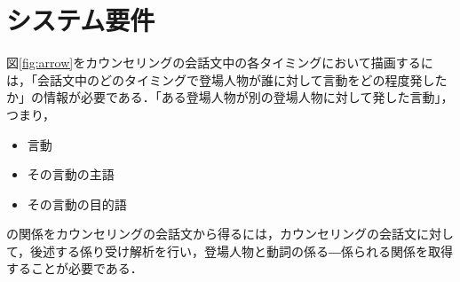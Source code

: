 \documentclass[shuuron]{kuee}
\begin{document}





%
%
%
%


\section{システム要件}%

%


図\ref{fig:arrow}をカウンセリングの会話文中の各タイミングにおいて描画するには，「会話文中のどのタイミングで登場人物が誰に対して言動をどの程度発したか」の情報が必要である．「ある登場人物が別の登場人物に対して発した言動」，つまり，
\begin{itemize}
  \item 言動
  \item その言動の主語
  \item その言動の目的語
\end{itemize}
の関係をカウンセリングの会話文から得るには，カウンセリングの会話文に対して，後述する係り受け解析を行い，登場人物と動詞の係る―係られる関係を取得することが必要である．
\end{document}
